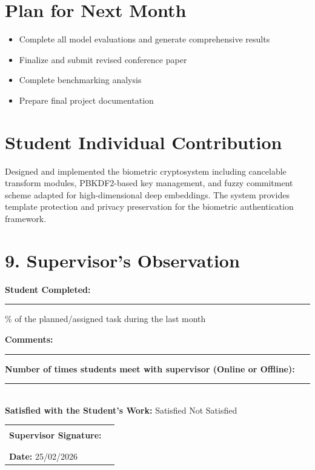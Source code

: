 \documentclass[12pt,a4paper]{article}
\begin{document}
\section{Plan for Next Month}
\begin{itemize}[leftmargin=*]
    \item Complete all model evaluations and generate comprehensive results
    \item Finalize and submit revised conference paper
    \item Complete benchmarking analysis
    \item Prepare final project documentation
\end{itemize}


\section{Student Individual Contribution}
Designed and implemented the biometric cryptosystem including cancelable transform modules, PBKDF2-based key management, and fuzzy commitment scheme adapted for high-dimensional deep embeddings. The system provides template protection and privacy preservation for the biometric authentication framework.

\section*{9. Supervisor's Observation}

\noindent\textbf{Student Completed:} \rule{3cm}{0.4pt}\% 
of the planned/assigned task during the last month

\vspace{0.5cm}

\noindent\textbf{Comments:}

\vspace{2cm}
\noindent\rule{\textwidth}{0.4pt}

\vspace{0.5cm}

\noindent\textbf{Number of times students meet with supervisor (Online or Offline):} \rule{1cm}{0.4pt} \\

\noindent\textbf{Satisfied with the Student's Work:} 
\hspace{0.5cm}  Satisfied 
\hspace{1cm}  Not Satisfied

\vspace{0.5cm}



\vspace{1.5cm}

\noindent\begin{tabular}{p{7cm} p{6cm}}
\textbf{Supervisor Signature:} & \rule{5cm}{0.4pt} \\
\\

\textbf{Date:} 25/02/2026
\end{tabular}

\vspace{0.8cm}
\end{document}

